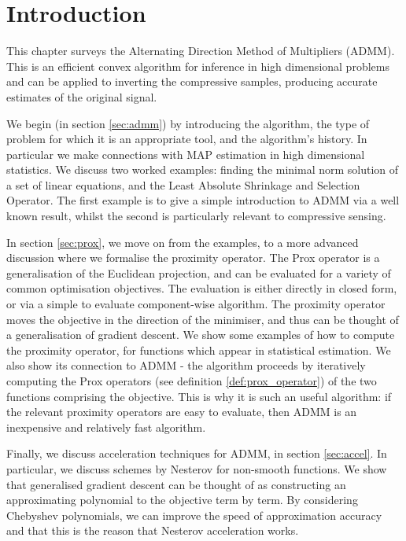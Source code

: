 \section{Introduction}\label{chap:admm}

This chapter surveys the Alternating Direction Method of Multipliers (ADMM). This is an efficient convex algorithm for inference in high dimensional problems and can be applied to inverting the compressive samples, producing accurate estimates of the original signal. 

We begin (in section \ref{sec:admm}) by introducing the algorithm, the type of problem for which it is an appropriate tool, and the algorithm's history. In particular we make connections with MAP estimation in high dimensional statistics. We discuss two worked examples: finding the minimal norm solution of a set of linear equations, and the Least Absolute Shrinkage and Selection Operator. The first example is to give a simple introduction to ADMM via a well known result, whilst the second is particularly relevant to compressive sensing. 

In section \ref{sec:prox}, we move on from the examples, to a more advanced discussion where we formalise the proximity operator. The Prox operator is a generalisation of the Euclidean projection, and can be evaluated for a variety of common optimisation objectives. The evaluation is either directly in closed form, or via a simple to evaluate component-wise algorithm. The proximity operator moves the objective in the direction of the minimiser, and thus can be thought of a generalisation of gradient descent. We show some examples of how to compute the proximity operator, for functions which appear in statistical estimation. We also show its connection to ADMM - the algorithm proceeds by iteratively computing the Prox operators (see definition \eqref{def:prox_operator}) of the two functions comprising the objective. This is why it is such an useful algorithm: if the relevant proximity operators are easy to evaluate, then ADMM is an inexpensive and relatively fast algorithm.

Finally, we discuss acceleration techniques for ADMM, in section \ref{sec:accel}. In particular, we discuss schemes by Nesterov for non-smooth functions. We show that generalised gradient descent can be thought of as constructing an approximating polynomial to the objective term by term. By considering Chebyshev polynomials, we can improve the speed of approximation accuracy and that this is the reason that Nesterov acceleration works.

